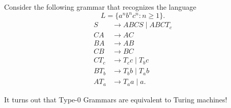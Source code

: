 	Consider the following grammar that recognizes the language
	\[ L = \{ a^nb^nc^n : n \ge 1 \}. \]
	\begin{align*}
		S &\to ABCS \mid ABCT_c \\
		CA &\to AC \\
		BA &\to AB \\
		CB &\to BC \\
		CT_c &\to T_cc \mid T_bc \\
		BT_b &\to T_bb \mid T_ab \\
		AT_a &\to T_aa \mid a.
	\end{align*}

	It turns out that Type-$0$ Grammars are equivalent to Turing machines!\\
